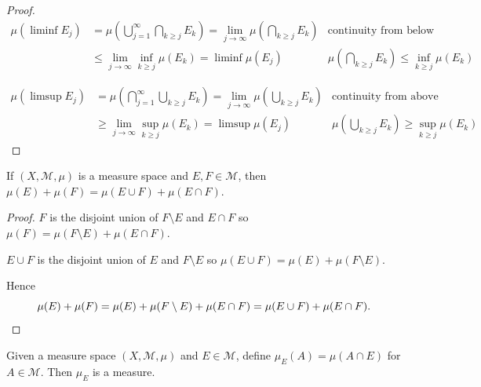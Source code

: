 \begin{proof}
    \begingroup
    \allowdisplaybreaks%
    \begin{align*}
        \mu(\liminf E_{j}) & = \mu\left( \bigcup_{j=1}^{\infty} \bigcap_{k\ge j} E_{k} \right) = \lim\limits_{j\to\infty} \mu\left(\bigcap_{k\ge j} E_{k}\right) & \text{continuity from below}                                               \\
                           & \le \lim\limits_{j\to \infty} \inf\limits_{k\ge j} \mu(E_{k}) = \liminf \mu(E_{j})                                                  & \mu\left(\bigcap_{k\ge j} E_{k}\right) \le \inf\limits_{k\ge j} \mu(E_{k})
    \end{align*}
    \endgroup

    \begingroup
    \allowdisplaybreaks%
    \begin{align*}
        \mu(\limsup E_{j}) & = \mu\left( \bigcap_{j=1}^{\infty} \bigcup_{k \ge j} E_{k} \right) = \lim\limits_{j\to\infty} \mu\left(\bigcup_{k\ge j} E_{k}\right) & \text{continuity from above}                                               \\
                           & \ge \lim\limits_{j\to\infty} \sup\limits_{k\ge j} \mu(E_{k}) = \limsup \mu(E_{j})                                                    & \mu\left(\bigcup_{k\ge j} E_{k}\right) \ge \sup\limits_{k\ge j} \mu(E_{k})
    \end{align*}
    \endgroup
\end{proof}

\newpage

\begin{exercise}
    If \( (X, \mathcal{M}, \mu) \) is a measure space and \( E, F \in \mathcal{M} \), then \( \mu(E) + \mu(F) = \mu(E \cup F) + \mu(E \cap F) \).
\end{exercise}

\begin{proof}
    \( F \) is the disjoint union of \( F \setminus E \) and \( E \cap F \) so \( \mu(F) = \mu(F \setminus E) + \mu(E \cap F) \).

    \( E \cup F \) is the disjoint union of \( E \) and \( F \setminus E \) so \( \mu(E \cup F) = \mu(E) + \mu(F \setminus E) \).

    Hence
    \[ \mu(E) + \mu(F) = \mu(E) + \mu(F \setminus E) + \mu(E \cap F) = \mu(E \cup F) + \mu(E \cap F). \qedhere \]
\end{proof}

\newpage

\begin{exercise}
    Given a measure space \( (X, \mathcal{M}, \mu) \) and \( E \in \mathcal{M} \), define \( \mu_{E}(A) = \mu(A \cap E) \) for \( A \in \mathcal{M} \). Then \( \mu_{E} \) is a measure.
\end{exercise}


